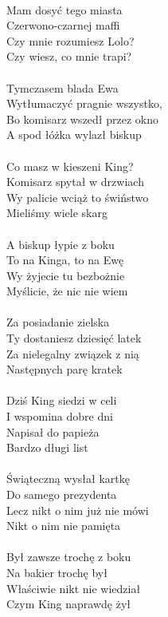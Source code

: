 \\
Mam dosyć tego miasta\\
Czerwono-czarnej maffi\\
Czy mnie rozumiesz Lolo?\\
Czy wiesz, co mnie trapi?\\
\\
Tymczasem blada Ewa\\
Wytłumaczyć pragnie wszystko,\\
Bo komisarz wszedł przez okno\\
A spod łóżka wylazł biskup\\
\\
Co masz w kieszeni King?\\
Komisarz spytał w drzwiach\\
Wy palicie wciąż to świństwo\\
Mieliśmy wiele skarg\\
\\
A biskup łypie z boku\\
To na Kinga, to na Ewę\\
Wy żyjecie tu bezbożnie\\
Myślicie, że nic nie wiem\\
\\
Za posiadanie zielska\\
Ty dostaniesz dziesięć latek\\
Za nielegalny związek z nią\\
Następnych parę kratek\\
\\
Dziś King siedzi w celi\\
I wspomina dobre dni\\
Napisał do papieża\\
Bardzo długi list\\
\\
Świąteczną wysłał kartkę\\
Do samego prezydenta\\
Lecz nikt o nim już nie mówi\\
Nikt o nim nie pamięta\\
\\
Był zawsze trochę z boku\\
Na bakier trochę był\\
Właściwie nikt nie wiedział\\
Czym King naprawdę żył\\
\newpage


